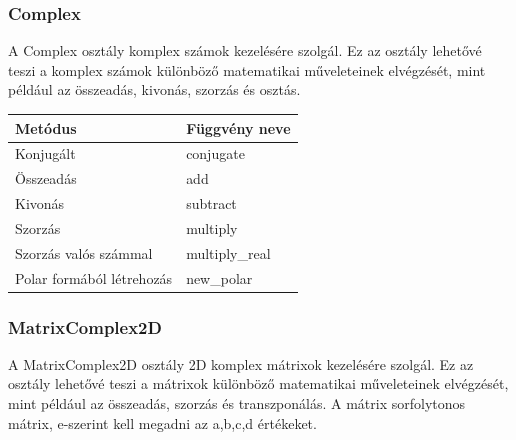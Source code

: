 \documentclass[fontsize=12pt,a4paper]{article}
\begin{document}
\subsubsection{Complex}

A Complex osztály komplex számok kezelésére szolgál. Ez az osztály lehetővé teszi a komplex számok különböző matematikai műveleteinek elvégzését, mint például az összeadás, kivonás, szorzás és osztás.

\begin{table}[h]
    \centering
\end{table}

\begin{table}[h!]
    \centering
    \begin{tabular}{|p{6cm}|p{10cm}|}
        \hline
        \textbf{Metódus} & \textbf{Függvény neve} \\ \hline
        Konjugált & conjugate \\ \hline
        Összeadás & add \\ \hline
        Kivonás & subtract \\ \hline
        Szorzás & multiply \\ \hline
        Szorzás valós számmal & multiply\_real \\ \hline
        Polar formából létrehozás & new\_polar \\ \hline
    \end{tabular}
\end{table}

\newpage
\subsubsection{MatrixComplex2D}

A MatrixComplex2D osztály 2D komplex mátrixok kezelésére szolgál. Ez az osztály lehetővé teszi a mátrixok különböző matematikai műveleteinek elvégzését, mint például az összeadás, szorzás és transzponálás. A mátrix sorfolytonos mátrix, e-szerint kell megadni az a,b,c,d értékeket.

\begin{table}[h!]
    \centering
\end{table}
\end{document}
